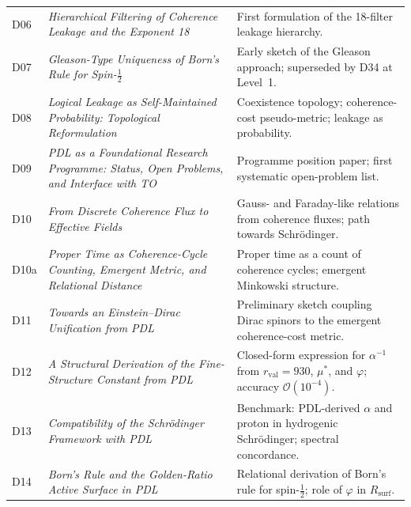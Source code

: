 \documentclass[11pt,a4paper]{article}
\theoremstyle{plain}
\theoremstyle{definition}
\theoremstyle{remark}
\newcommand{\rval}{r_{\mathrm{val}}}
\newcommand{\Rsurf}{R_{\mathrm{surf}}}
\begin{document}
\begin{longtable}{@{}L{1.3cm}L{3.8cm}L{8.0cm}@{}}
D06 & \textit{Hierarchical Filtering of Coherence Leakage and the Exponent 18}~\citep{D06} & First formulation of the 18-filter leakage hierarchy. \\[0.3em]

D07 & \textit{Gleason-Type Uniqueness of Born's Rule for Spin-$\tfrac{1}{2}$}~\citep{D07} & Early sketch of the Gleason approach; superseded by D34 at Level~1. \\[0.3em]

D08 & \textit{Logical Leakage as Self-Maintained Probability: Topological Reformulation}~\citep{D08} & Coexistence topology; coherence-cost pseudo-metric; leakage as probability. \\[0.3em]

D09 & \textit{PDL as a Foundational Research Programme: Status, Open Problems, and Interface with TO}~\citep{D09} & Programme position paper; first systematic open-problem list. \\[0.3em]

D10 & \textit{From Discrete Coherence Flux to Effective Fields}~\citep{D10} & Gauss- and Faraday-like relations from coherence fluxes; path towards Schr\"odinger. \\[0.3em]

D10a & \textit{Proper Time as Coherence-Cycle Counting, Emergent Metric, and Relational Distance}~\citep{D10a} & Proper time as a count of coherence cycles; emergent Minkowski structure. \\[0.3em]

D11 & \textit{Towards an Einstein--Dirac Unification from PDL}~\citep{D11} & Preliminary sketch coupling Dirac spinors to the emergent coherence-cost metric. \\[0.3em]

D12 & \textit{A Structural Derivation of the Fine-Structure Constant from PDL}~\citep{D12} & Closed-form expression for $\alpha^{-1}$ from $\rval=930$, $\mu^*$, and $\varphi$; accuracy $\mathcal{O}(10^{-4})$. \\[0.3em]

D13 & \textit{Compatibility of the Schr\"odinger Framework with PDL}~\citep{D13} & Benchmark: PDL-derived $\alpha$ and proton in hydrogenic Schr\"odinger; spectral concordance. \\[0.3em]

D14 & \textit{Born's Rule and the Golden-Ratio Active Surface in PDL}~\citep{D14} & Relational derivation of Born's rule for spin-$\tfrac{1}{2}$; role of $\varphi$ in $\Rsurf$. \\[0.3em]


\end{longtable}
\end{document}
